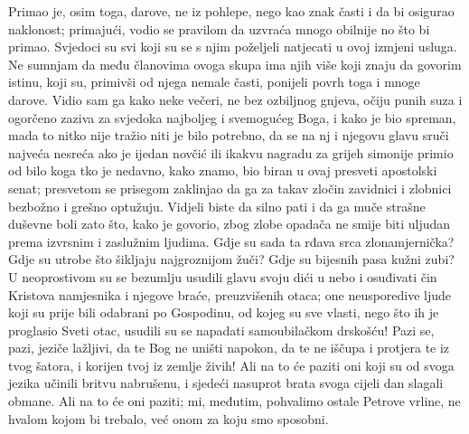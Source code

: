 \documentclass[a5paper,twoside]{article}
\begin{document}
\pend
\pstart
Primao je, osim toga, darove, ne iz pohlepe, nego kao znak časti i da bi osigurao naklonost; primajući, vodio se pravilom da uzvraća mnogo obilnije no što bi primao.  Svjedoci su svi koji su se s njim poželjeli natjecati u ovoj izmjeni usluga.  Ne sumnjam da među članovima ovoga skupa ima njih više koji znaju da govorim istinu, koji su, primivši od njega nemale časti, ponijeli povrh toga i mnoge darove.
\pend
\pstart
Vidio sam ga kako neke večeri, ne bez ozbiljnog gnjeva, očiju punih suza i ogorčeno zaziva za svjedoka najboljeg i svemogućeg Boga, i kako je bio spreman, mada to nitko nije tražio niti je bilo potrebno, da se na nj i njegovu glavu sruči najveća nesreća ako je ijedan novčić ili ikakvu nagradu za grijeh simonije primio od bilo koga tko je nedavno, kako znamo, bio biran u ovaj presveti apostolski senat; presvetom se prisegom zaklinjao da ga za takav zločin zavidnici i zlobnici bezbožno i grešno optužuju.  Vidjeli biste da silno pati i da ga muče strašne duševne boli zato što, kako je govorio, zbog zlobe opadača ne smije biti uljudan prema izvrsnim i zaslužnim ljudima.
\pend
\pstart
Gdje su sada ta rđava srca zlonamjernička?  Gdje su utrobe što šikljaju najgroznijom žuči?  Gdje su bijesnih pasa kužni zubi?  U neoprostivom su se bezumlju usudili glavu svoju dići u nebo i osuđivati čin Kristova namjesnika i njegove braće, preuzvišenih otaca; one neusporedive ljude koji su prije bili odabrani po Gospodinu, od kojeg su sve vlasti, nego što ih je proglasio Sveti otac, usudili su se napadati samoubilačkom drskošću!  Pazi se, pazi, jeziče lažljivi, da te Bog ne uništi napokon, da te ne iščupa i protjera te iz tvog šatora, i korijen tvoj iz zemlje živih! Ali na to će paziti oni koji su od svoga jezika učinili britvu nabrušenu, i sjedeći nasuprot brata svoga cijeli dan slagali obmane. Ali na to će oni paziti; mi, međutim, pohvalimo ostale Petrove vrline, ne hvalom kojom bi trebalo, već onom za koju smo sposobni.  
\pend
\pstart
\end{document}
